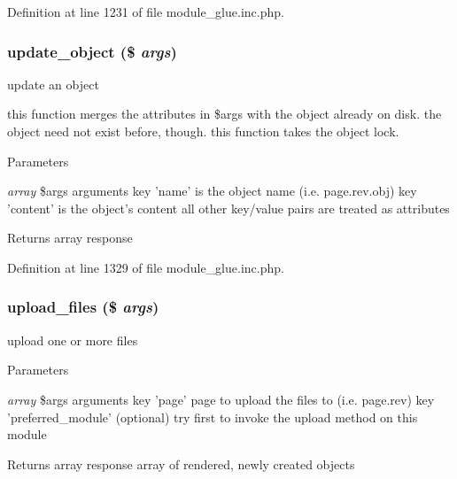 Definition at line 1231 of file module\_\-glue.inc.php.

\hypertarget{module__glue_8inc_8php_a4aed316adcde13b40c9fc1b35e6537a4}{
\subsubsection[{update\_\-object}]{\setlength{\rightskip}{0pt plus 5cm}update\_\-object (\$ {\em args})}}
\label{module__glue_8inc_8php_a4aed316adcde13b40c9fc1b35e6537a4}
update an object

this function merges the attributes in \$args with the object already on disk. the object need not exist before, though. this function takes the object lock. 
\begin{DoxyParams}{Parameters}
\item[{\em array}]\$args arguments key 'name' is the object name (i.e. page.rev.obj) key 'content' is the object's content all other key/value pairs are treated as attributes \end{DoxyParams}
\begin{DoxyReturn}{Returns}
array response 
\end{DoxyReturn}


Definition at line 1329 of file module\_\-glue.inc.php.

\hypertarget{module__glue_8inc_8php_a43746135e67f614d79317029aced064b}{
\subsubsection[{upload\_\-files}]{\setlength{\rightskip}{0pt plus 5cm}upload\_\-files (\$ {\em args})}}
\label{module__glue_8inc_8php_a43746135e67f614d79317029aced064b}
upload one or more files


\begin{DoxyParams}{Parameters}
\item[{\em array}]\$args arguments key 'page' page to upload the files to (i.e. page.rev) key 'preferred\_\-module' (optional) try first to invoke the upload method on this module \end{DoxyParams}
\begin{DoxyReturn}{Returns}
array response array of rendered, newly created objects 
\end{DoxyReturn}


